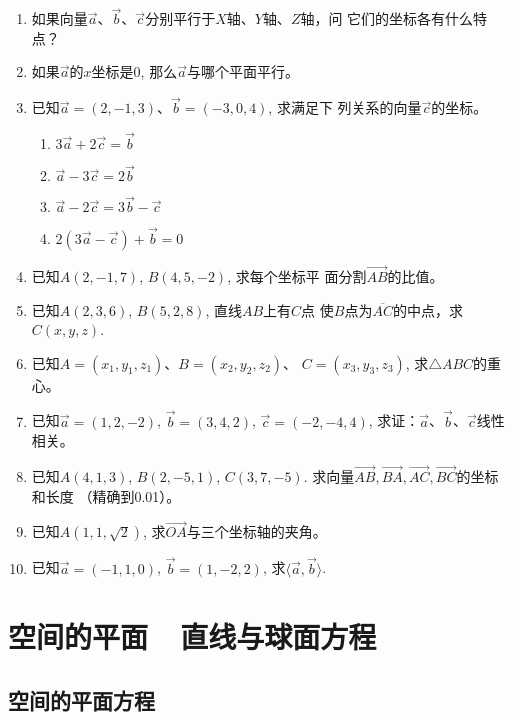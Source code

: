 \begin{enumerate}
    \item 如果向量$\vec{a}$、$\vec{b}$、$\vec{c}$分别平行于$X$轴、$Y$轴、$Z$轴，问
    它们的坐标各有什么特点？
    \item 
    如果$\vec{a}$的$x$坐标是0, 那么$\vec{a}$与哪个平面平行。
    \item 已知$\vec{a}=(2,-1,3)$、$\vec{b}=(-3,0,4)$, 求满足下
    列关系的向量$\vec{c}$的坐标。
\begin{multicols}{2}
\begin{enumerate}
    \item $3\vec{a}+2\vec{c}=\vec{b}$
    \item $\vec{a}-3\vec{c}=2\vec{b}$
    \item $\vec{a}-2\vec{c}=3\vec{b}-\vec{c}$
    \item $2(3\vec{a}-\vec{c})+\vec{b}=0$
\end{enumerate}
\end{multicols}
    \item 已知$A(2,-1,7)$, $B(4,5,-2)$, 求每个坐标平
    面分割$\Vec{AB}$的比值。
    \item 已知$A(2,3,6)$, $B(5,2,8)$, 直线$AB$上有$C$点
    使$B$点为$\overline{AC}$的中点，求$C(x,y,z)$.
    \item 已知$A=(x_1,y_1,z_1)$、$B=(x_2,y_2,z_2)$、
    $C=(x_3,y_3,z_3)$, 求$\triangle ABC$的重心。

    \item 已知$\vec{a}=(1,2,-2)$, $\vec{b}=(3,4,2)$,
    $\vec{c}=(-2,-4,4)$, 求证：$\vec{a}$、$\vec{b}$、$\vec{c}$线性相关。

    \item 已知$A(4,1,3)$, $B(2,-5,1)$, $C(3,7,-5)$. 求向量$\Vec{AB},\Vec{BA},\Vec{AC},\Vec{BC}$的坐标和长度
    （精确到0.01）。
    \item 已知$A(1,1,\sqrt{2})$, 求$\Vec{OA}$与三个坐标轴的夹角。
    \item 已知$\vec{a}=(-1,1,0)$, $\vec{b}=(1,-2,2)$,
    求$\langle \vec{a},\vec{b}\rangle$.
\end{enumerate}

\section{空间的平面~~直线与球面方程}

\subsection{空间的平面方程}

